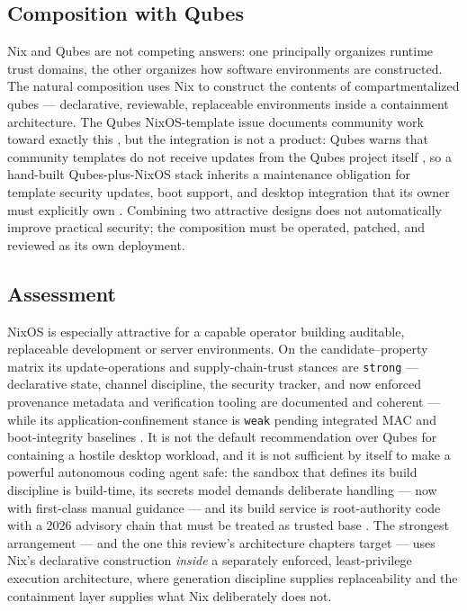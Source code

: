 \documentclass[
  english,
  9pt,
]{extarticle}
\begin{document}
\subsection{Composition with Qubes}\label{composition-with-qubes}

Nix and Qubes are not competing answers: one principally organizes
runtime trust domains, the other organizes how software environments are
constructed. The natural composition uses Nix to construct the contents
of compartmentalized qubes --- declarative, reviewable, replaceable
environments inside a containment architecture. The Qubes NixOS-template
issue documents community work toward exactly this
\citep{qubes_issue_7992}, but the integration is not a product: Qubes
warns that community templates do not receive updates from the Qubes
project itself \citep{qubes_templates}, so a hand-built Qubes-plus-NixOS
stack inherits a maintenance obligation for template security updates,
boot support, and desktop integration that its owner must explicitly own
\citep{nixos_security_wiki, lanzaboote_packaging_pr}. Combining two
attractive designs does not automatically improve practical security;
the composition must be operated, patched, and reviewed as its own
deployment.

\subsection{Assessment}\label{assessment-1}

NixOS is especially attractive for a capable operator building
auditable, replaceable development or server environments. On the
candidate--property matrix its update-operations and supply-chain-trust
stances are \texttt{strong} --- declarative state, channel discipline,
the security tracker, and now enforced provenance metadata and
verification tooling are documented and coherent
\citep{nixpkgs_source_provenance, sbomnix} --- while its
application-confinement stance is \texttt{weak} pending integrated MAC
and boot-integrity baselines
\citep{nixos_security_wiki, nixos_lanzaboote_wiki}. It is not the
default recommendation over Qubes for containing a hostile desktop
workload, and it is not sufficient by itself to make a powerful
autonomous coding agent safe: the sandbox that defines its build
discipline is build-time, its secrets model demands deliberate handling
--- now with first-class manual guidance \citep{nix_2_35_notes} --- and
its build service is root-authority code with a 2026 advisory chain that
must be treated as trusted base
\citep{nix_sandbox_config, nix_store_secrets, nix_ghsa_g3g9, nix_ghsa_vh5x, nix_ghsa_gr92}.
The strongest arrangement --- and the one this review's architecture
chapters target --- uses Nix's declarative construction \emph{inside} a
separately enforced, least-privilege execution architecture, where
generation discipline supplies replaceability and the containment layer
supplies what Nix deliberately does not.
\end{document}
